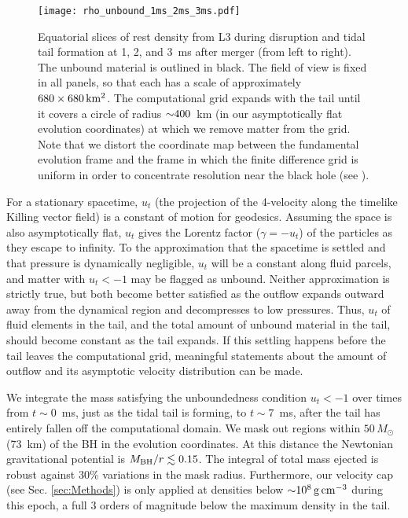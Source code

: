 \begin{figure*} \centering
\texttt{[image: rho\_unbound\_1ms\_2ms\_3ms.pdf]}
\caption{
Equatorial slices of rest density from L3
during disruption and tidal tail formation at 1, 2, and 3~ms after merger
(from left to right).
The unbound material is outlined in black. The field of
view is fixed in all panels, so that each
has a scale of approximately $680\times680\rm\,km^2$.
The computational grid expands with the tail until it covers a circle of
radius $\mathord{\sim}400$~km (in our asymptotically flat evolution coordinates)
at which we remove matter from the grid. Note that we distort the
coordinate map between the fundamental evolution frame and the
frame in which the finite difference grid is uniform
in order to concentrate resolution near the black hole (see \citealt{Duez:2009yy}).
}
\label{fig:disruptionsnapshots}
\end{figure*}

For a stationary spacetime, $u_t$ (the projection of the 4-velocity along
the timelike Killing vector field) is a constant of motion for geodesics. 
Assuming the space is also asymptotically flat, $u_t$ gives the Lorentz
factor ($\gamma=-u_t$) of the particles as they escape to infinity.  To the
approximation that the spacetime is settled and that pressure is dynamically
negligible, $u_t$ will be a constant along fluid parcels, and matter with
$u_t<-1$ may be flagged as unbound. Neither approximation is strictly true,
but both become better satisfied as the outflow expands outward away from
the dynamical region and decompresses to low pressures.  Thus, $u_t$ of
fluid elements in the tail, and the total amount of unbound material in
the tail, should become constant as the tail expands.  If this settling
happens before the tail leaves the computational grid, meaningful statements
about the amount of outflow and its asymptotic velocity distribution can
be made.

We integrate the mass satisfying the unboundedness
condition $u_t<-1$ over times from $t \sim 0$~ms, just as
the tidal tail is forming, to $t \sim 7$~ms, after the tail has entirely fallen off
the computational domain. We mask out regions within
$50\,M_{\odot}$ (73~km) of the BH in the evolution coordinates.
At this distance the Newtonian gravitational
potential is $M_{\rm BH}/r \lesssim 0.15$.
The integral of total mass ejected is robust against
30\% variations in the mask radius.
Furthermore, our velocity cap (see Sec. \ref{sec:Methods}) is only applied
at densities below $\mathord{\sim} 10^{8}\rm\,g\,cm^{-3}$ during this epoch, a full 3
orders of magnitude below the maximum density in the tail.


